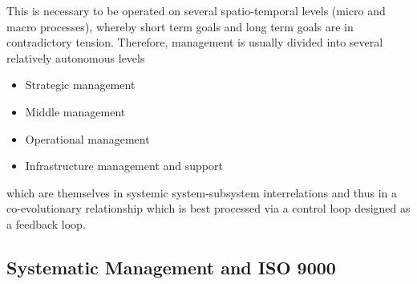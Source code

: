\documentclass[11pt,a4paper]{article}
\begin{document}
This is necessary to be operated on several spatio-temporal levels (micro and
macro processes), whereby short term goals and long term goals are in 
contradictory tension. Therefore, management is usually divided into several
relatively autonomous levels
\begin{itemize}
\item Strategic management
\item Middle management
\item Operational management
\item Infrastructure management and support
\end{itemize}
which are themselves in systemic system-subsystem interrelations and thus in a
co-evolutio\-nary relationship which is best processed via a control loop
designed as a feedback loop.

\subsection{Systematic Management and ISO 9000}
\end{document}
